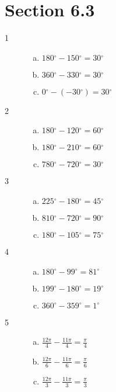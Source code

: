 \documentclass{exam}
\newcommand{\dg}{\ensuremath{^\circ}}
\begin{document}
    \section{Section 6.3}

    \begin{description}

      \item[1] 
        \begin{enumerate}[(a)]
          \item $180 \dg - 150 \dg = \boxed{ 30 \dg }$
          \item $360 \dg - 330 \dg = \boxed{ 30 \dg }$
          \item $0 \dg - (-30 \dg) = \boxed{ 30 \dg }$
        \end{enumerate}

      \item[2] 
        \begin{enumerate}[(a)]
          \item $180 \dg - 120 \dg = \boxed{ 60 \dg }$
          \item $180 \dg - 210 \dg = \boxed{ 60 \dg }$
          \item $780 \dg - 720 \dg = \boxed{ 30 \dg }$
        \end{enumerate}

      \item[3] 
        \begin{enumerate}[(a)]
          \item $225 \dg - 180 \dg = \boxed{ 45 \dg }$
          \item $810 \dg - 720 \dg = \boxed{ 90 \dg }$
          \item $180 \dg - 105 \dg = \boxed{ 75 \dg }$
        \end{enumerate}

      \item[4] 
        \begin{enumerate}[(a)]
          \item $180 \dg - 99 \dg = \boxed{ 81 \dg }$
          \item $199 \dg - 180 \dg = \boxed{ 19 \dg }$
          \item $360 \dg - 359 \dg = \boxed{ 1 \dg }$
        \end{enumerate}

      \item[5] 
        \begin{enumerate}[(a)]
          \item $\frac{12 \pi}{4} - \frac{11 \pi}{4} = \boxed{ \frac{\pi}{4} }$
          \item $\frac{12 \pi}{6} - \frac{11 \pi}{6} = \boxed{ \frac{\pi}{6} }$
          \item $\frac{12 \pi}{3} - \frac{11 \pi}{3} = \boxed{ \frac{\pi}{3} }$
        \end{enumerate}


\end{description}
\end{document}
